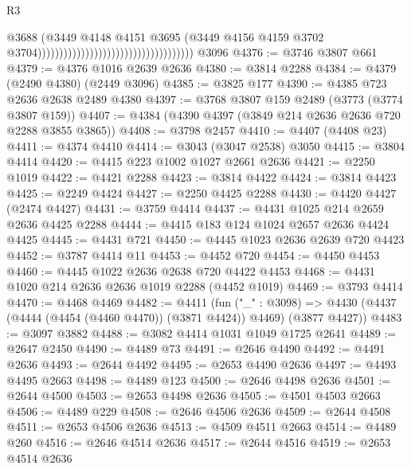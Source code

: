 \begin{lexlean}{R3}
\begin{coremodule}
                                                                        @3688
                                                                        (@3449
                                                                          @4148
                                                                          @4151
                                                                          @3695
                                                                          (@3449
                                                                            @4156
                                                                            @4159
                                                                            @3702
                                                                            @3704))))))))))))))))))))))))))))))))))))
    @3096
@4376 := @3746 @3807 @661
@4379 := @4376 @1016 @2639 @2636
@4380 := @3814 @2288
@4384 := @4379 (@2490 @4380) (@2449 @3096)
@4385 := @3825 @177
@4390 := @4385 @723 @2636 @2638 @2489 @4380
@4397 := @3768 @3807 @159 @2489 (@3773 (@3774 @3807 @159))
@4407 := @4384 (@4390 @4397 (@3849 @214 @2636 @2636 @720 @2288 @3855 @3865))
@4408 := @3798 @2457
@4410 := @4407 (@4408 @23)
@4411 := @4374 @4410
@4414 := @3043 (@3047 @2538) @3050
@4415 := @3804 @4414
@4420 := @4415 @223 @1002 @1027 @2661 @2636
@4421 := @2250 @1019
@4422 := @4421 @2288
@4423 := @3814 @4422
@4424 := @3814 @4423
@4425 := @2249 @4424
@4427 := @2250 @4425 @2288
@4430 := @4420 @4427 (@2474 @4427)
@4431 := @3759 @4414
@4437 := @4431 @1025 @214 @2659 @2636 @4425 @2288
@4444 := @4415 @183 @124 @1024 @2657 @2636 @4424 @4425
@4445 := @4431 @721
@4450 := @4445 @1023 @2636 @2639 @720 @4423
@4452 := @3787 @4414 @11
@4453 := @4452 @720
@4454 := @4450 @4453
@4460 := @4445 @1022 @2636 @2638 @720 @4422 @4453
@4468 := @4431 @1020 @214 @2636 @2636 @1019 @2288 (@4452 @1019)
@4469 := @3793 @4414
@4470 := @4468 @4469
@4482 := @4411
    (fun ("_" : @3098) =>
    @4430 (@4437 (@4444 (@4454 (@4460 @4470)) (@3871 @4424)) @4469) (@3877 @4427))
@4483 := @3097 @3882
@4488 := @3082 @4414 @1031 @1049 @1725 @2641
@4489 := @2647 @2450
@4490 := @4489 @73
@4491 := @2646 @4490
@4492 := @4491 @2636
@4493 := @2644 @4492
@4495 := @2653 @4490 @2636
@4497 := @4493 @4495 @2663
@4498 := @4489 @123
@4500 := @2646 @4498 @2636
@4501 := @2644 @4500
@4503 := @2653 @4498 @2636
@4505 := @4501 @4503 @2663
@4506 := @4489 @229
@4508 := @2646 @4506 @2636
@4509 := @2644 @4508
@4511 := @2653 @4506 @2636
@4513 := @4509 @4511 @2663
@4514 := @4489 @260
@4516 := @2646 @4514 @2636
@4517 := @2644 @4516
@4519 := @2653 @4514 @2636

\end{coremodule}
\end{lexlean}
